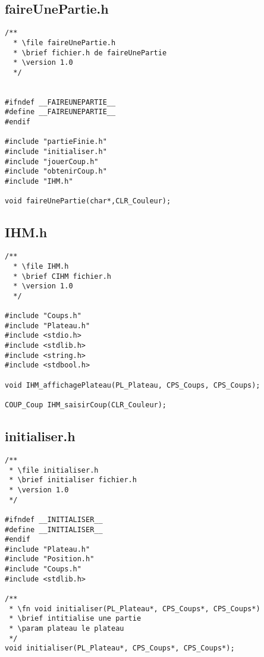 \subsection{faireUnePartie.h}
\begin{lstlisting}
/**
  * \file faireUnePartie.h
  * \brief fichier.h de faireUnePartie
  * \version 1.0
  */


#ifndef __FAIREUNEPARTIE__
#define __FAIREUNEPARTIE__
#endif

#include "partieFinie.h"
#include "initialiser.h"
#include "jouerCoup.h"
#include "obtenirCoup.h"
#include "IHM.h"

void faireUnePartie(char*,CLR_Couleur);  
\end{lstlisting}

\subsection{IHM.h}
\begin{lstlisting}
/**
  * \file IHM.h
  * \brief CIHM fichier.h
  * \version 1.0
  */

#include "Coups.h"
#include "Plateau.h"
#include <stdio.h>
#include <stdlib.h>
#include <string.h>
#include <stdbool.h>

void IHM_affichagePlateau(PL_Plateau, CPS_Coups, CPS_Coups);
  
COUP_Coup IHM_saisirCoup(CLR_Couleur);  
\end{lstlisting}

\subsection{initialiser.h}
\begin{lstlisting}
/**
 * \file initialiser.h
 * \brief initialiser fichier.h
 * \version 1.0
 */

#ifndef __INITIALISER__
#define __INITIALISER__
#endif
#include "Plateau.h"
#include "Position.h"
#include "Coups.h"
#include <stdlib.h>

/**
 * \fn void initialiser(PL_Plateau*, CPS_Coups*, CPS_Coups*)
 * \brief intitialise une partie
 * \param plateau le plateau 
 */
void initialiser(PL_Plateau*, CPS_Coups*, CPS_Coups*);
\end{lstlisting}

